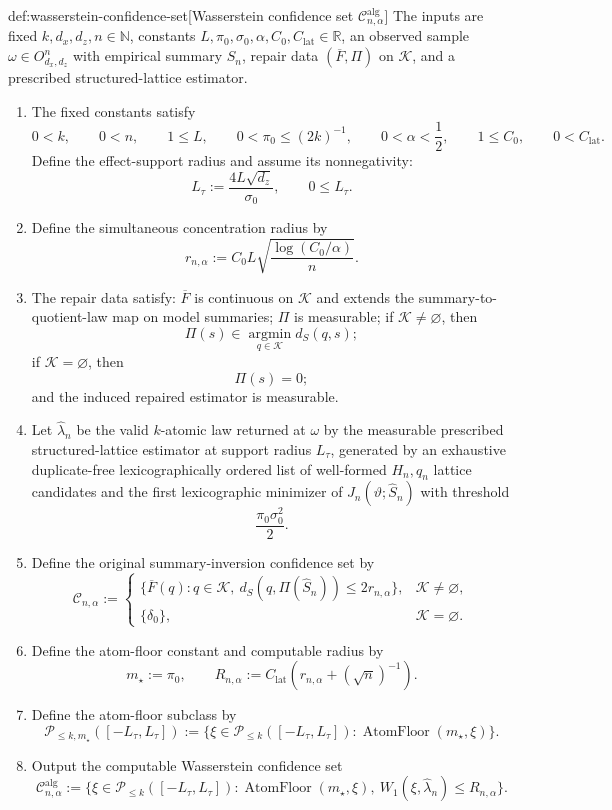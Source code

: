 \documentclass[11pt]{article}
\begin{document}
\begin{algorithmv}{def:wasserstein-confidence-set}[Wasserstein confidence set \(\mathcal C^{\mathrm{alg}}_{n,\alpha}\)]
The inputs are fixed \(k,d_x,d_z,n\in\mathbb N\), constants \(L,\pi_0,\sigma_0,\alpha,C_0,C_{\mathrm{lat}}\in\mathbb R\), an observed sample \(\omega\in O_{d_x,d_z}^n\) with empirical summary \(\widehat S_n\), repair data \((\overline F,\Pi)\) on \(\mathcal K\), and a prescribed structured-lattice estimator.
\begin{enumerate}
\item The fixed constants satisfy
\[
0<k,\qquad 0<n,\qquad 1\le L,\qquad
0<\pi_0\le (2k)^{-1},\qquad
0<\alpha<\frac12,\qquad
1\le C_0,\qquad 0<C_{\mathrm{lat}}.
\]
Define the effect-support radius and assume its nonnegativity:
\[
L_\tau:=\frac{4L\sqrt{d_z}}{\sigma_0},\qquad 0\le L_\tau.
\]
\item Define the simultaneous concentration radius by
\[
r_{n,\alpha}:=C_0L\sqrt{\frac{\log(C_0/\alpha)}{n}}.
\]
\item The repair data satisfy: \(\overline F\) is continuous on \(\mathcal K\) and extends the summary-to-quotient-law map on model summaries; \(\Pi\) is measurable; if \(\mathcal K\ne\varnothing\), then
\[
\Pi(s)\in\operatorname*{argmin}_{q\in\mathcal K}d_S(q,s);
\]
if \(\mathcal K=\varnothing\), then
\[
\Pi(s)=0;
\]
and the induced repaired estimator is measurable.
\item Let \(\widehat\lambda_n\) be the valid \(k\)-atomic law returned at \(\omega\) by the measurable prescribed structured-lattice estimator at support radius \(L_\tau\), generated by an exhaustive duplicate-free lexicographically ordered list of well-formed \(H_n,q_n\) lattice candidates and the first lexicographic minimizer of \(J_n(\vartheta;\widehat S_n)\) with threshold
\[
\frac{\pi_0\sigma_0^2}{2}.
\]
\item Define the original summary-inversion confidence set by
\[
\mathcal C_{n,\alpha}:=
\begin{cases}
\{\overline F(q):q\in\mathcal K,\ d_S(q,\Pi(\widehat S_n))\le2r_{n,\alpha}\},&\mathcal K\ne\varnothing,\\
\{\delta_0\},&\mathcal K=\varnothing.
\end{cases}
\]
\item Define the atom-floor constant and computable radius by
\[
m_\star:=\pi_0,\qquad
R_{n,\alpha}:=C_{\mathrm{lat}}\left(r_{n,\alpha}+(\sqrt n)^{-1}\right).
\]
\item Define the atom-floor subclass by
\[
\mathcal P_{\le k,m_\star}([-L_\tau,L_\tau])
:=
\{\xi\in\mathcal P_{\le k}([-L_\tau,L_\tau]):
\operatorname{AtomFloor}(m_\star,\xi)\}.
\]
\item Output the computable Wasserstein confidence set
\[
\mathcal C^{\mathrm{alg}}_{n,\alpha}
:=
\{\xi\in\mathcal P_{\le k}([-L_\tau,L_\tau]):
\operatorname{AtomFloor}(m_\star,\xi),\
W_1(\xi,\widehat\lambda_n)\le R_{n,\alpha}\}.
\]
\end{enumerate}
\end{algorithmv}
\end{document}
